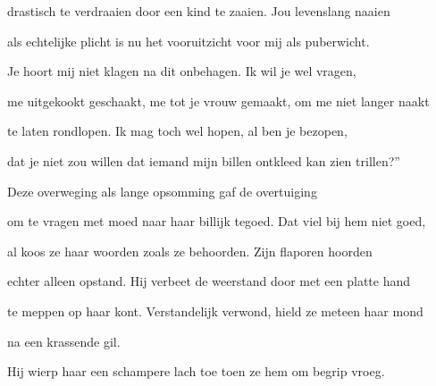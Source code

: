 drastisch te verdraaien
door een kind te zaaien.
Jou levenslang naaien

als echtelijke plicht
is nu het vooruitzicht
voor mij als puberwicht.

Je hoort mij niet klagen
na dit onbehagen.
Ik wil je wel vragen,

me uitgekookt geschaakt,
me tot je vrouw gemaakt,
om me niet langer naakt

te laten rondlopen.
Ik mag toch wel hopen,
al ben je bezopen,

dat je niet zou willen
dat iemand mijn billen
ontkleed kan zien trillen?”

Deze overweging
als lange opsomming
gaf de overtuiging

om te vragen met moed
naar haar billijk tegoed.
Dat viel bij hem niet goed,

al koos ze haar woorden
zoals ze behoorden.
Zijn flaporen hoorden

echter alleen opstand.
Hij verbeet de weerstand
door met een platte hand

te meppen op haar kont.
Verstandelijk verwond,
hield ze meteen haar mond

na een krassende gil.

Hij wierp haar een schampere lach toe toen ze hem om begrip vroeg.
